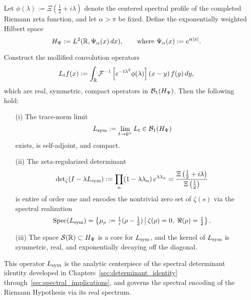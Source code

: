 \begin{theorem}
\label{thm:canonical_operator_realization}
Let \( \phi(\lambda) := \Xi\left( \tfrac{1}{2} + i\lambda \right) \) denote the centered spectral profile of the completed Riemann zeta function, and let \( \alpha > \pi \) be fixed. Define the exponentially weighted Hilbert space
\[
H_{\Psi} := L^2(\mathbb{R}, \Psi_\alpha(x)\, dx), \qquad \text{where } \Psi_\alpha(x) := e^{\alpha |x|}.
\]

Construct the mollified convolution operators
\[
L_t f(x) := \int_{\mathbb{R}} \mathcal{F}^{-1}\left[ e^{-t\lambda^2} \phi(\lambda) \right](x - y)\, f(y)\, dy,
\]
which are real, symmetric, compact operators in \( \mathcal{B}_1(H_{\Psi}) \). Then the following hold:

\begin{itemize}
    \item[\textup{(i)}] The trace-norm limit
    \[
    L_{\mathrm{sym}} := \lim_{t \to 0^+} L_t \in \mathcal{B}_1(H_{\Psi})
    \]
    exists, is self-adjoint, and compact.

    \item[\textup{(ii)}] The zeta-regularized determinant
    \[
    \det\nolimits_{\zeta}(I - \lambda L_{\mathrm{sym}}) := \prod_n (1 - \lambda \lambda_n)\, e^{\lambda \lambda_n}
    = \frac{\Xi\left( \tfrac{1}{2} + i\lambda \right)}{\Xi\left( \tfrac{1}{2} \right)}
    \]
    is entire of order one and encodes the nontrivial zero set of \( \zeta(s) \) via the spectral realization
    \[
    \operatorname{Spec}(L_{\mathrm{sym}}) = \left\{ \mu_\rho := \tfrac{1}{i}(\rho - \tfrac{1}{2}) \,\middle|\, \zeta(\rho) = 0,\; \Re(\rho) = \tfrac{1}{2} \right\}.
    \]

    \item[\textup{(iii)}] The space \( \mathcal{S}(\mathbb{R}) \subset H_{\Psi} \) is a core for \( L_{\mathrm{sym}} \), and the kernel of \( L_{\mathrm{sym}} \) is symmetric, real, and exponentially decaying off the diagonal.
\end{itemize}

\noindent
This operator \( L_{\mathrm{sym}} \) is the analytic centerpiece of the spectral determinant identity developed in Chapters~\ref{sec:determinant_identity} through~\ref{sec:spectral_implications}, and governs the spectral encoding of the Riemann Hypothesis via its real spectrum.
\end{theorem}
